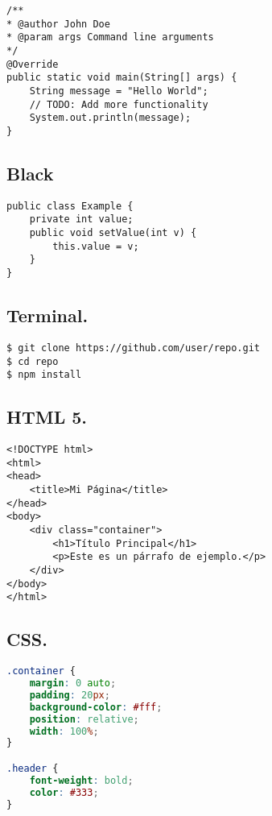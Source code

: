 	\begin{lstlisting}[style=eclipse]
/**
* @author John Doe
* @param args Command line arguments
*/
@Override
public static void main(String[] args) {
	String message = "Hello World";
	// TODO: Add more functionality
	System.out.println(message);
}
	\end{lstlisting}
	
\subsection{Black}
	
	\begin{lstlisting}[style=black]
public class Example {
	private int value;
	public void setValue(int v) {
		this.value = v;
	}
}
	\end{lstlisting}
	
\subsection{Terminal.}

	\begin{lstlisting}[style=terminal]
$ git clone https://github.com/user/repo.git
$ cd repo
$ npm install
	\end{lstlisting}
	
	





\subsection{HTML 5.}

	\begin{lstlisting}[language=HTML5]
<!DOCTYPE html>
<html>
<head>
	<title>Mi Página</title>
</head>
<body>
	<div class="container">
		<h1>Título Principal</h1>
		<p>Este es un párrafo de ejemplo.</p>
	</div>
</body>
</html>
	\end{lstlisting}

\subsection{CSS.}

	\begin{lstlisting}[language=CSS]
.container {
	margin: 0 auto;
	padding: 20px;
	background-color: #fff;
	position: relative;
	width: 100%;
}

.header {
	font-weight: bold;
	color: #333;
}
	\end{lstlisting}
	
